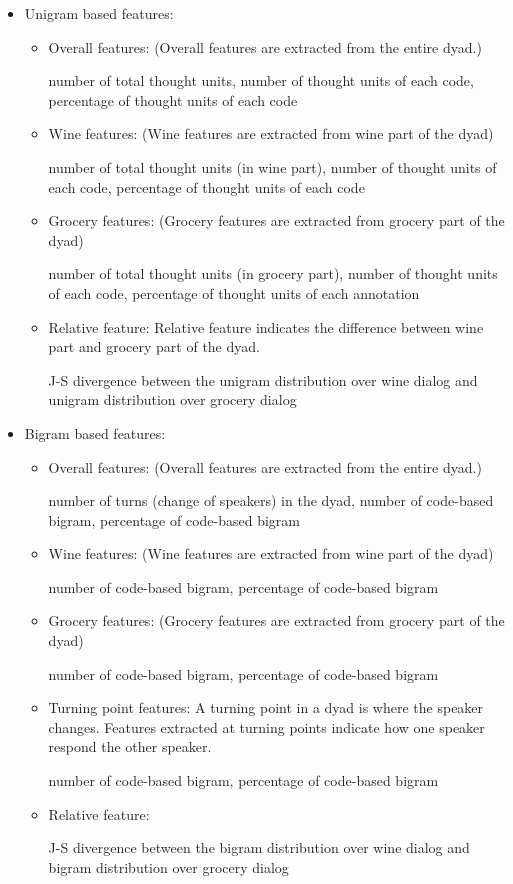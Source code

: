 \documentclass[11pt]{article} %
\begin{document}
\begin{itemize}
\item Unigram based features:
\begin{itemize}
\item Overall features: (Overall features are extracted from the entire dyad.)

      number of total thought units, number of thought units of each code, percentage of thought units of each code
\item Wine features: (Wine features are extracted from wine part of the dyad)

      number of total thought units (in wine part), number of thought units of each code, percentage of thought units of each code

\item Grocery features: (Grocery features are extracted from grocery part of the dyad)

number of total thought units (in grocery part), number of thought units of each code, percentage of thought units of each annotation

\item Relative feature: Relative feature indicates the difference between wine part and grocery part of the dyad.

J-S divergence between the unigram distribution over wine dialog and unigram distribution over grocery dialog
\end{itemize}
\item Bigram based features:
\begin{itemize}
\item Overall features: (Overall features are extracted from the entire dyad.)

      number of turns (change of speakers) in the dyad, number of code-based bigram, percentage of code-based bigram
\item Wine features: (Wine features are extracted from wine part of the dyad)

      number of code-based bigram, percentage of code-based bigram
\item Grocery features: (Grocery features are extracted from grocery part of the dyad)

      number of code-based bigram, percentage of code-based bigram
\item Turning point features: A turning point in a dyad is where the speaker changes. Features extracted at turning points indicate how one speaker respond the other speaker.

      number of code-based bigram, percentage of code-based bigram

\item Relative feature:

      J-S divergence between the bigram distribution over wine dialog and bigram distribution over grocery dialog
\end{itemize}
\end{itemize}
\end{document}
